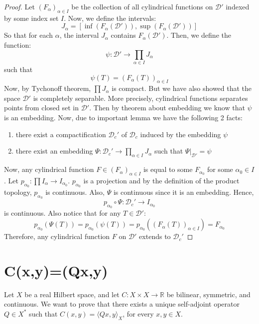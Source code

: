 \documentclass{article}
\theoremstyle{definition}
\begin{document}
\begin{proof}
    Let $(F_\alpha)_{\alpha \in I}$ be the collection of all cylindrical functions on $\mathcal{D}'$ indexed by some index set $I$. Now, we define the intervals:
    \[
    J_\alpha = [\inf(F_\alpha(\mathcal{D}')), \sup(F_\alpha(\mathcal{D}'))]
    \]
 So that for each $\alpha$, the interval $J_\alpha$ contains $F_\alpha(\mathcal{D}')$. Then, we define the function: 
    \[
    \psi: \mathcal{D}' \rightarrow \prod_{\alpha\in I} J_{\alpha}
    \]
such that
    \[
    \psi(T) = (F_\alpha(T))_{\alpha \in I}
    \]
    Now, by Tychonoff theorem, $\prod J_{\alpha}$ is compact. But we have also showed that the space $\mathcal{D}'$ is completely separable. More precisely, cylindrical functions separates points from closed set in $\mathcal{D}'$. Then by theorem about embedding we know that $\psi$ is an embedding. Now, due to important lemma we have the following 2 facts:
    \begin{enumerate}
        \item  there exist a compactification $\mathcal{D}_c'$ of $\mathcal{D}_c$ induced by the embedding $\psi$
        \item there exist an embedding $\Psi: \mathcal{D}_c' \rightarrow \prod_{\alpha\in I} J_{\alpha}$ such that $\Psi|_{\mathcal{D}'} = \psi$
    \end{enumerate}
Now, any cylindrical function $F \in (F_\alpha)_{\alpha \in I}$ is equal to some $F_{\alpha_0}$ for some $\alpha_0 \in I$. Let $p_{\alpha_0}: \prod I_\alpha \rightarrow I_{\alpha_0}$. $p_{\alpha_0}$ is a projection and by the definition of the product topology, $p_{\alpha_0}$ is continuous. Also, $\Psi$ is continuous since it is an embedding. Hence, 
\[
p_{\alpha_0} \circ \Psi: \mathcal{D}_c' \rightarrow I_{\alpha_0}
\]
is continuous. Also notice that for any $T \in \mathcal{D}'$:
\[
p_{\alpha_0} ( \Psi(T)) = p_{\alpha_0} ( \psi(T)) =p_{\alpha_0} ((F_\alpha(T))_{\alpha \in I}) = F_{\alpha_0}
\]
Therefore, any cylindrical function $F$ on $\mathcal{D}'$ extends to $\mathcal{D}_c'$
    
   
\end{proof}

\section{C(x,y)=(Qx,y)}
Let $X$ be a real Hilbert space, and let $C : X \times X \rightarrow \mathbb{R}$ be bilinear, symmetric, and continuous. We want to prove that there exists a unique self-adjoint operator $Q \in X^*$ such that $C(x, y) = \langle Qx, y \rangle_X$, for every $x, y \in X$.
\end{document}
